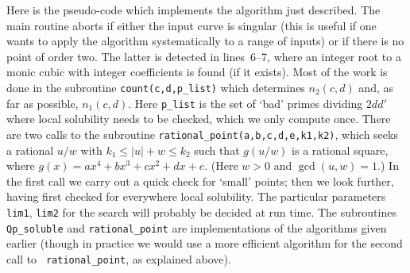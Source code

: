 Here is the pseudo-code which implements the algorithm just described.
The main routine aborts if either the input curve is singular (this is
useful if one wants to apply the algorithm systematically to a range
of inputs) or if there is no point of order two.  The latter is
detected in lines~6--7, where an integer root to a monic cubic with
integer coefficients is found (if it exists).  Most of the work is
done in the subroutine {\tt count(c,d,p\_list)} which determines
$n_2(c,d)$ and, as far as possible, $n_1(c,d)$.  Here {\tt p\_list} is
the set of `bad' primes dividing $2dd'$ where local solubility needs
to be checked, which we only compute once.  There are two
calls to the subroutine {\tt rational\_point(a,b,c,d,e,k1,k2)}, which
seeks a rational $u/w$ with $k_1\le |u|+w \le k_2$ such that $g(u/w)$
is a rational square, where $g(x)=ax^4+bx^3+cx^2+dx+e$.  (Here $w>0$
and $\gcd(u,w)=1$.)  In the first call we carry out a quick check for
`small' points; then we look further, having first checked for
everywhere local solubility.  The particular parameters {\tt lim1},
{\tt lim2} for the search will probably be decided at run time. The
subroutines {\tt Qp\_soluble} and {\tt rational\_point} are
implementations of the algorithms given earlier (though in practice we
would use a more efficient algorithm for the second call to {\tt
rational\_point}, as explained above).

